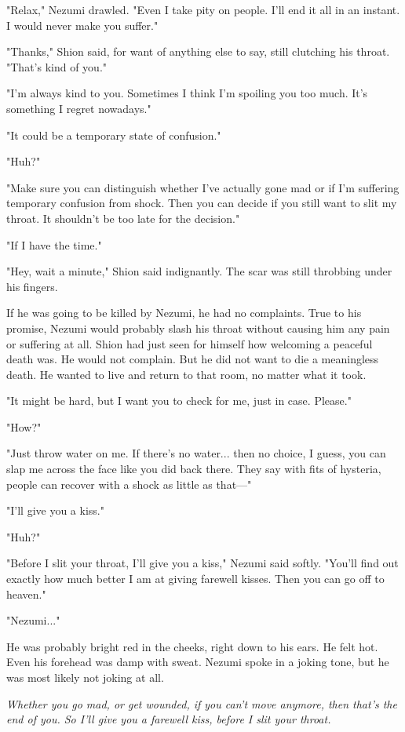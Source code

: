 "Relax," Nezumi drawled. "Even I take pity on people. I'll end it all in
an instant. I would never make you suffer."

"Thanks," Shion said, for want of anything else to say, still clutching
his throat. "That's kind of you."

"I'm always kind to you. Sometimes I think I'm spoiling you too much.
It's something I regret nowadays."

"It could be a temporary state of confusion."

"Huh?"

"Make sure you can distinguish whether I've actually gone mad or if I'm
suffering temporary confusion from shock. Then you can decide if you
still want to slit my throat. It shouldn't be too late for the
decision."

"If I have the time."

"Hey, wait a minute," Shion said indignantly. The scar was still
throbbing under his fingers.

If he was going to be killed by Nezumi, he had no complaints. True to
his promise, Nezumi would probably slash his throat without causing him
any pain or suffering at all. Shion had just seen for himself how
welcoming a peaceful death was. He would not complain. But he did not
want to die a meaningless death. He wanted to live and return to that
room, no matter what it took.

"It might be hard, but I want you to check for me, just in case.
Please."

"How?"

"Just throw water on me. If there's no water... then no choice, I guess,
you can slap me across the face like you did back there. They say with
fits of hysteria, people can recover with a shock as little as that---"

"I'll give you a kiss."

"Huh?"

"Before I slit your throat, I'll give you a kiss," Nezumi said softly.
"You'll find out exactly how much better I am at giving farewell kisses.
Then you can go off to heaven."

"Nezumi..."

He was probably bright red in the cheeks, right down to his ears. He
felt hot. Even his forehead was damp with sweat. Nezumi spoke in a
joking tone, but he was most likely not joking at all.

\emph{Whether you go mad, or get wounded, if you can't move anymore, then
that's the end of you. So I'll give you a farewell kiss, before I slit
your throat.}

